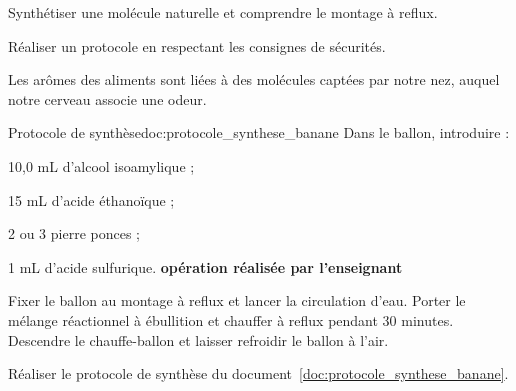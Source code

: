 \teteSndChim

\vspace*{-38pt}

\begin{objectifs}
  \item Synthétiser une molécule naturelle et comprendre le montage à reflux.
  \item Réaliser un protocole en respectant les consignes de sécurités.
\end{objectifs}

\begin{contexte}
  Les arômes des aliments sont liées à des molécules captées par notre nez, auquel notre cerveau associe une odeur.
  
\end{contexte}


\begin{doc}{Protocole de synthèse}{doc:protocole_synthese_banane}
  Dans le ballon, introduire :
  \begin{listePoints}
    \item 10,0 mL d'alcool isoamylique ;
    \item 15 mL d'acide éthanoïque ;
    \item 2 ou 3 pierre ponces ;
    \item 1 mL d'acide sulfurique. \attention \textbf{opération réalisée par l'enseignant} \attention
  \end{listePoints}
  
  Fixer le ballon au montage à reflux et lancer la circulation d'eau.
  Porter le mélange réactionnel à ébullition et chauffer à reflux pendant 30 minutes.
  Descendre le chauffe-ballon et laisser refroidir le ballon à l'air.
\end{doc}

\mesure Réaliser le protocole de synthèse du document~\ref{doc:protocole_synthese_banane}.


